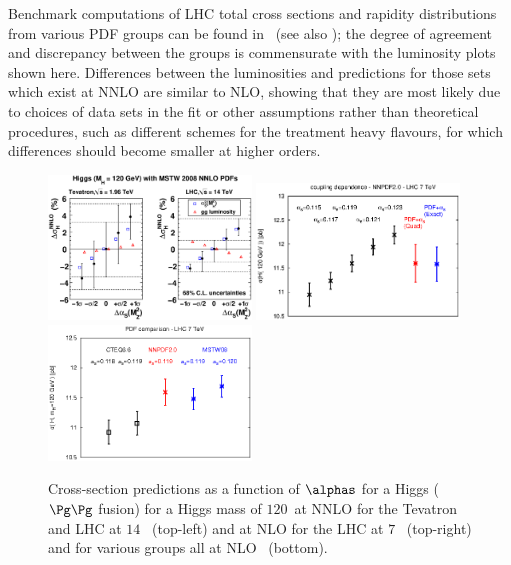 Benchmark computations of LHC total 
cross sections and rapidity distributions from various PDF groups
can be found in~
(see also );  the degree of agreement and 
discrepancy between the groups is commensurate with the luminosity plots 
shown here. Differences between the luminosities and predictions 
for those sets which exist at NNLO are similar to NLO, showing that 
they are most likely due to choices of data sets in the fit or other assumptions 
rather than theoretical procedures, such as 
different schemes for the treatment heavy flavours, 
for which differences should become smaller at higher orders.

\begin{figure}
  \begin{center}
    \includegraphics[width=0.48\textwidth]{YRHXS_PDF/YRHXS_PDF_3.eps}
    \includegraphics[width=0.48\textwidth]{YRHXS_PDF/YRHXS_PDF_4.eps}\\
\vspace{-0.2cm}
\includegraphics[width=0.48\textwidth]{YRHXS_PDF/YRHXS_PDF_5.eps}
\vspace{-0.6cm}
\caption{\label{fig:Higgscs} Cross-section predictions as a function
  of $\alphas$ for a Higgs 
($\Pg\Pg$ fusion) for a Higgs mass of $120$\UGeV\ at NNLO for the 
Tevatron and LHC at $14$\UTeV~\cite{Martin:2009bu} (top-left)  
and at NLO for the LHC at $7$\UTeV~\cite{Ubiali:2010xc} (top-right) and for 
various groups all at NLO~\cite{Ubiali:2010xc} (bottom).}
\vspace{-0.6cm}
\end{center}
\end{figure}

